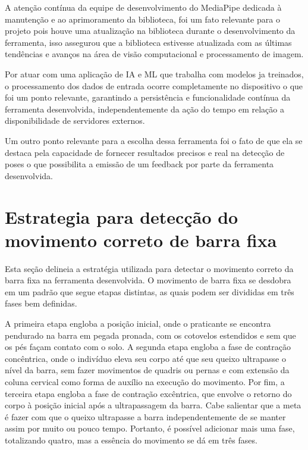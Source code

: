 A atenção contínua da equipe de desenvolvimento do MediaPipe dedicada à manutenção e ao aprimoramento da biblioteca, foi um  fato relevante para o projeto pois houve uma atualização na biblioteca durante o desenvolvimento da ferramenta, isso assegurou que a biblioteca estivesse atualizada com as últimas tendências e avanços na área de visão computacional e processamento de imagem.

Por atuar com uma aplicação de \ac{IA} e \ac{ML} que trabalha com modelos ja treinados, o processamento dos dados de entrada ocorre completamente no dispositivo o que foi um ponto relevante, garantindo a persistência e funcionalidade contínua da ferramenta desenvolvida, independentemente da ação do tempo em relação a disponibilidade de servidores externos.

Um outro ponto relevante para a escolha dessa ferramenta foi o fato de que ela se destaca pela capacidade de fornecer resultados precisos e real na detecção de poses o que possibilita a emissão de um feedback por parte da ferramenta desenvolvida.





\section[Estrategia para detecção do movimento correto de barra fixa]{Estrategia para detecção do movimento correto de barra fixa}\label{sec:Estrategia para deteccao do movimento correto de barra fixa}


Esta seção delineia a estratégia utilizada para detectar o movimento correto da barra fixa na ferramenta desenvolvida. O movimento de barra fixa se desdobra em um padrão que segue etapas distintas, as quais podem ser divididas em três fases bem definidas. 

A primeira etapa engloba a posição inicial, onde o praticante se encontra pendurado na barra em pegada pronada, com os cotovelos estendidos e sem que os pés façam contato com o solo. A segunda etapa engloba a fase de contração concêntrica, onde o indivíduo eleva seu corpo até que seu queixo ultrapasse o nível da barra, sem fazer movimentos de quadris ou pernas e com extensão da coluna cervical como forma de auxílio na execução do movimento. Por fim, a terceira etapa engloba a fase de contração excêntrica, que envolve o retorno do corpo à posição inicial após a ultrapassagem da barra. Cabe salientar que a meta é fazer com que o queixo ultrapasse a barra independentemente de se manter assim por muito ou pouco tempo. Portanto, é possível adicionar mais uma fase, totalizando quatro, mas a essência do movimento se dá em três fases.

